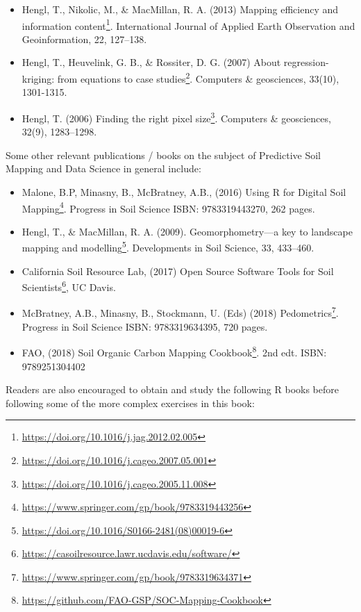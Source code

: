 \documentclass[graybox,natbib,nospthms,UStrade]{svmono}
\renewcommand{\href}[2]{#2 (\url{#1})}
\renewcommand{\href}[2]{#2\footnote{\url{#1}}}
\begin{document}
\begin{itemize}
\item
  Hengl, T., Nikolic, M., \& MacMillan, R. A. (2013) \href{https://doi.org/10.1016/j.jag.2012.02.005}{Mapping efficiency and information content}. International Journal of Applied Earth Observation and Geoinformation, 22, 127--138.
\item
  Hengl, T., Heuvelink, G. B., \& Rossiter, D. G. (2007) \href{https://doi.org/10.1016/j.cageo.2007.05.001}{About regression-kriging: from equations to case studies}. Computers \& geosciences, 33(10), 1301-1315.
\item
  Hengl, T. (2006) \href{https://doi.org/10.1016/j.cageo.2005.11.008}{Finding the right pixel size}. Computers \& geosciences, 32(9), 1283--1298.
\end{itemize}

Some other relevant publications / books on the subject of Predictive Soil Mapping and Data Science in general include:

\begin{itemize}
\item
  Malone, B.P, Minasny, B., McBratney, A.B., (2016) \href{https://www.springer.com/gp/book/9783319443256}{Using R for Digital Soil Mapping}. Progress in Soil Science
  ISBN: 9783319443270, 262 pages.
\item
  Hengl, T., \& MacMillan, R. A. (2009). \href{https://doi.org/10.1016/S0166-2481(08)00019-6}{Geomorphometry---a key to landscape mapping and modelling}. Developments in Soil Science, 33, 433--460.
\item
  California Soil Resource Lab, (2017) \href{https://casoilresource.lawr.ucdavis.edu/software/}{Open Source Software Tools for Soil Scientists}, UC Davis.
\item
  McBratney, A.B., Minasny, B., Stockmann, U. (Eds) (2018) \href{https://www.springer.com/gp/book/9783319634371}{Pedometrics}. Progress in Soil Science
  ISBN: 9783319634395, 720 pages.
\item
  FAO, (2018) \href{https://github.com/FAO-GSP/SOC-Mapping-Cookbook}{Soil Organic Carbon Mapping Cookbook}. 2nd edt. ISBN: 9789251304402
\end{itemize}

Readers are also encouraged to obtain and study the following R books before following some of the more complex exercises in this book:
\end{document}
